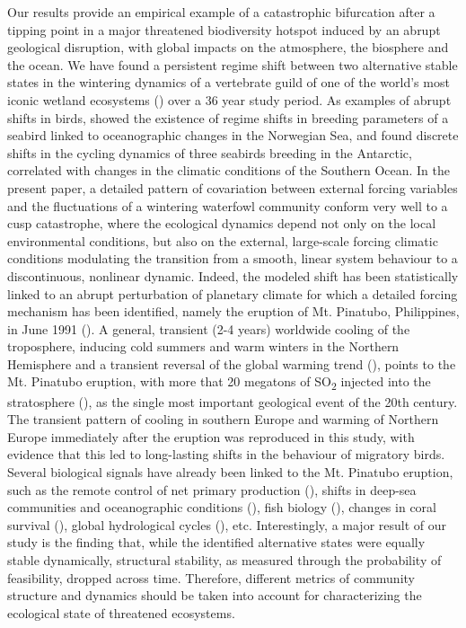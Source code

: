 \documentclass[12pt]{article}
\begin{document}
Our results provide an empirical example of a catastrophic bifurcation after a tipping point in a major threatened biodiversity hotspot induced by an abrupt geological disruption, with global impacts on the atmosphere, the biosphere and the ocean. We have found a persistent regime shift between two alternative stable states in the wintering dynamics of a vertebrate guild of one of the world's most iconic wetland ecosystems (\cite{Scheffer2015a}) over a 36 year study period. As examples of abrupt shifts in birds, \cite{Durant2004} showed the existence of regime shifts in breeding parameters of a seabird linked to oceanographic changes in the Norwegian Sea, and \cite{Jenouvrier2005} found discrete shifts in the cycling dynamics of three seabirds breeding in the Antarctic, correlated with changes in the climatic conditions of the Southern Ocean. In the present paper, a detailed pattern of covariation between external forcing variables and the fluctuations of a wintering waterfowl community conform very well to a cusp catastrophe, where the ecological dynamics depend not only on the local environmental conditions, but also on the external, large-scale forcing climatic conditions modulating the transition from a smooth, linear system behaviour to a discontinuous, nonlinear dynamic. Indeed, the modeled shift has been statistically linked to an abrupt perturbation of planetary climate for which a detailed forcing mechanism has been identified, namely the eruption of Mt. Pinatubo, Philippines, in June 1991 (\cite{Hansen1992,Labitzke1992,Robock2000,Robock2002,Douglass2005}). A general, transient (2-4 years) worldwide cooling of the troposphere, inducing cold summers and warm winters in the Northern Hemisphere and a transient reversal of the global warming trend (\cite{Robock2000,Robock2002,Lucht2002a,Church2005,Smith2016a}), points to the Mt. Pinatubo eruption, with more that 20 megatons of SO\textsubscript{2} injected into the stratosphere (\cite{Hansen1992}), as the single most important geological event of the 20th century. The transient pattern of cooling in southern Europe and warming of Northern Europe immediately after the eruption was reproduced in this study, with evidence that this led to long-lasting shifts in the behaviour of migratory birds. Several biological signals have already been linked to the Mt. Pinatubo eruption, such as the remote control of net primary production (\cite{Lucht2002a,Krakauer2003}), shifts in deep-sea communities and oceanographic conditions (\cite{Hess2001,Kuhnt2005,Yao2018}), fish biology (\cite{Gaston2003a}), changes in coral survival (\cite{Genin1995}), global hydrological cycles (\cite{Trenberth2007}), etc. Interestingly, a major result of our study is the finding that, while the identified alternative states were equally stable dynamically, structural stability, as measured through the probability of feasibility, dropped across time. Therefore, different metrics of community structure and dynamics should be taken into account for characterizing the ecological state of threatened ecosystems.  \\
\end{document}
